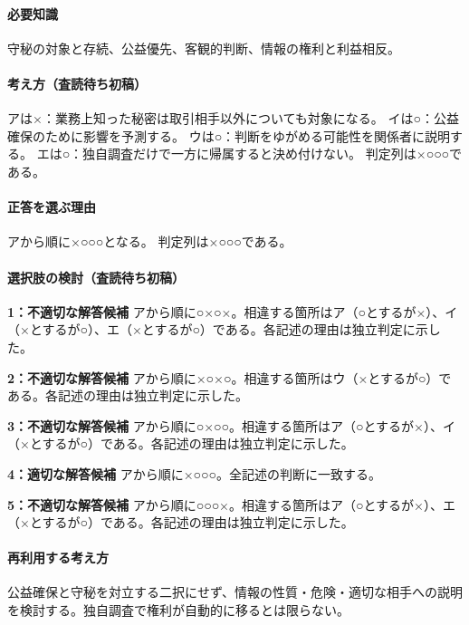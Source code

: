 \paragraph{必要知識} 守秘の対象と存続、公益優先、客観的判断、情報の権利と利益相反。

\paragraph{考え方（査読待ち初稿）} アは×：業務上知った秘密は取引相手以外についても対象になる。 イは○：公益確保のために影響を予測する。 ウは○：判断をゆがめる可能性を関係者に説明する。 エは○：独自調査だけで一方に帰属すると決め付けない。 判定列は×○○○である。

\paragraph{正答を選ぶ理由} アから順に×○○○となる。  判定列は×○○○である。

\paragraph{選択肢の検討（査読待ち初稿）}

\noindent\textbf{1：不適切な解答候補} アから順に○×○×。相違する箇所はア（○とするが×）、イ（×とするが○）、エ（×とするが○）である。各記述の理由は独立判定に示した。\par

\noindent\textbf{2：不適切な解答候補} アから順に×○×○。相違する箇所はウ（×とするが○）である。各記述の理由は独立判定に示した。\par

\noindent\textbf{3：不適切な解答候補} アから順に○×○○。相違する箇所はア（○とするが×）、イ（×とするが○）である。各記述の理由は独立判定に示した。\par

\noindent\textbf{4：適切な解答候補} アから順に×○○○。全記述の判断に一致する。\par

\noindent\textbf{5：不適切な解答候補} アから順に○○○×。相違する箇所はア（○とするが×）、エ（×とするが○）である。各記述の理由は独立判定に示した。\par

\paragraph{再利用する考え方} 公益確保と守秘を対立する二択にせず、情報の性質・危険・適切な相手への説明を検討する。独自調査で権利が自動的に移るとは限らない。

